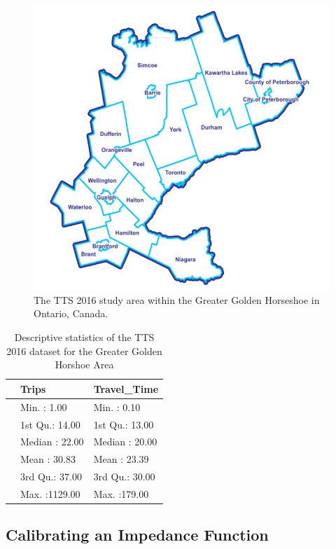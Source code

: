 \documentclass[]{elsarticle} %
\begin{document}
\begin{figure}
\includegraphics[width=1\linewidth]{images/Greater-Golden-Horseshoe-Map} \caption{\label{fig:TTS-16-survey-area}The TTS 2016 study area within the Greater Golden Horseshoe in Ontario, Canada.}\label{fig:TTS-16-survey-area}
\end{figure}

\begin{table}

\caption{\label{tab:unnamed-chunk-1}\label{tab:TTS-16-desc-stats}Descriptive statistics of the TTS 2016 dataset for the Greater Golden Horshoe Area}
\centering
\begin{tabular}[t]{l|l|l}
\hline
  & Trips & Travel\_Time\\
\hline
 & Min.   :   1.00 & Min.   :  0.10\\
\hline
 & 1st Qu.:  14.00 & 1st Qu.: 13.00\\
\hline
 & Median :  22.00 & Median : 20.00\\
\hline
 & Mean   :  30.83 & Mean   : 23.39\\
\hline
 & 3rd Qu.:  37.00 & 3rd Qu.: 30.00\\
\hline
 & Max.   :1129.00 & Max.   :179.00\\
\hline
\end{tabular}
\end{table}

\hypertarget{calibrating-an-impedance-function}{%
\subsection{Calibrating an Impedance
Function}\label{calibrating-an-impedance-function}}
\end{document}
